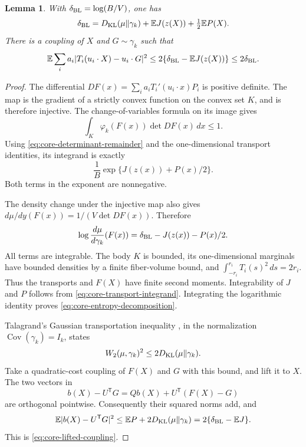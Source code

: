 \documentclass[11pt,a4paper]{article}
\newtheorem{lemma}[theorem]{Lemma}
\theoremstyle{remark}\newtheorem{remark}[theorem]{Remark}
\numberwithin{equation}{section}
\begin{document}
\begin{lemma}\label{lem:core-entropy-coupling}
With $\delta_{\rm BL}=\log(B/V)$, one has
\begin{equation}\label{eq:core-entropy-decomposition}
 \delta_{\rm BL}
 =D_{\rm KL}(\mu\|\gamma_k)+\mathbb E J(z(X))
                                     +\tfrac12\mathbb E P(X).
\end{equation}
There is a coupling of $X$ and $G\sim\gamma_k$ such that
\begin{equation}\label{eq:core-lifted-coupling}
 \mathbb E\sum_i a_i
       |T_i(u_i\cdot X)-u_i\cdot G|^2
 \le2\{\delta_{\rm BL}-\mathbb E J(z(X))\}
 \le2\delta_{\rm BL}.
\end{equation}
\end{lemma}
\begin{proof}
The differential
$DF(x)=\sum_i a_iT_i'(u_i\cdot x)P_i$ is positive definite.
The map is the gradient of a strictly convex function on the convex
set $K$, and is therefore injective. The change-of-variables formula
on its image gives
\[
 \int_K\varphi_k(F(x))\det DF(x)\,dx\le1.
\]
Using \eqref{eq:core-determinant-remainder} and the one-dimensional
transport identities, its integrand is exactly
\begin{equation}\label{eq:core-transport-integrand}
 \frac1B\exp\{J(z(x))+P(x)/2\}.
\end{equation}
Both terms in the exponent are nonnegative.

The density change under the injective map also gives
$d\mu/dy(F(x))=1/(V\det DF(x))$. Therefore
\[
 \log\frac{d\mu}{d\gamma_k}(F(x))
 =\delta_{\rm BL}-J(z(x))-P(x)/2.
\]
All terms are integrable. The body $K$ is bounded, its one-dimensional
marginals have bounded densities by a finite fiber-volume bound, and
$\int_{-r_i}^{r_i}T_i(s)^2\,ds=2r_i$. Thus the transports and $F(X)$
have finite second moments. Integrability of $J$ and $P$ follows from
\eqref{eq:core-transport-integrand}. Integrating the logarithmic identity
proves \eqref{eq:core-entropy-decomposition}.

Talagrand's Gaussian transportation inequality \cite{Talagrand1996},
in the normalization $\operatorname{Cov}(\gamma_k)=I_k$, states
\[
 W_2(\mu,\gamma_k)^2\le2D_{\rm KL}(\mu\|\gamma_k).
\]
Take a quadratic-cost coupling of $F(X)$ and $G$ with this bound,
and lift it to $X$. The two vectors in
\[
 b(X)-U^{\mathsf T}G
   =Qb(X)+U^{\mathsf T}(F(X)-G)
\]
are orthogonal pointwise. Consequently their squared norms add, and
\[
 \mathbb E|b(X)-U^{\mathsf T}G|^2
 \le\mathbb E P+2D_{\rm KL}(\mu\|\gamma_k)
 =2\{\delta_{\rm BL}-\mathbb E J\}.
\]
This is \eqref{eq:core-lifted-coupling}.
\end{proof}
\end{document}
